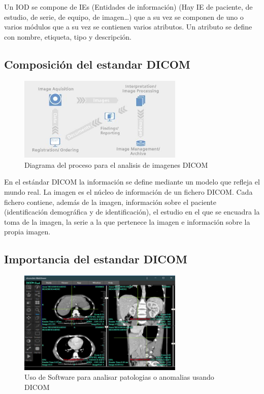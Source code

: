 \documentclass{article}
\begin{document}
Un IOD se compone de IEs (Entidades de información) (Hay IE de paciente, de estudio, de serie,  de equipo, de imagen…) que a su vez se componen de uno o varios módulos que a su vez se contienen varios atributos. Un atributo se define con nombre, etiqueta, tipo y descripción.

\subsection{Composición del estandar DICOM}

\begin{figure}[H]
\centering
\includegraphics[width=0.7\textwidth]{img/dicom_diagram.jpg}
\caption{Diagrama del proceso para el analisis de imagenes DICOM}
\end{figure}

En el estándar DICOM la información se define mediante un modelo que refleja el mundo real. La imagen es el núcleo de información de un fichero DICOM. Cada fichero contiene, además de la imagen, información sobre el paciente (identificación demográfica y de identificación), el estudio en el que se encuadra la toma de la imagen, la serie a la que pertenece la imagen e información sobre la propia imagen.

\subsection{Importancia del estandar DICOM}

\begin{figure}[H]
\centering
\includegraphics[width=0.7\textwidth]{img/dicom_real.jpg}
\caption{Uso de Software para analisar patologias o anomalias usando DICOM}
\end{figure}
\end{document}
